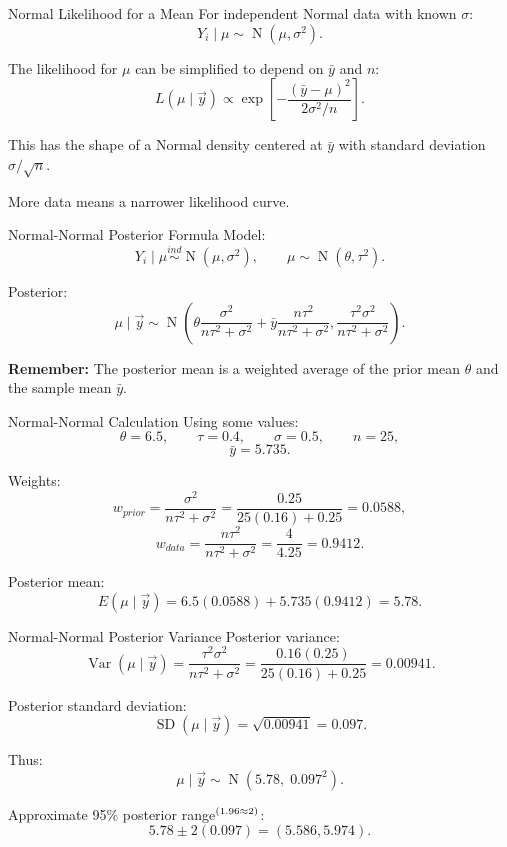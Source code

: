 \documentclass[aspectratio=43,11pt]{beamer}
\newcommand{\Normal}{\operatorname{N}}
\begin{document}
\begin{frame}{Normal Likelihood for a Mean}
For independent Normal data with known $\sigma$:
\[
  Y_i\mid\mu\sim\Normal(\mu,\sigma^2).
\]

The likelihood for $\mu$ can be simplified to depend on $\bar y$ and $n$:
\[
  L(\mu\mid\vec y)
  \propto
  \exp\left[-\frac{(\bar y-\mu)^2}{2\sigma^2/n}\right].
\]

\medskip
This has the shape of a Normal density centered at $\bar y$ with standard deviation $\sigma/\sqrt n$.

\medskip
More data means a narrower likelihood curve.
\end{frame}

\begin{frame}{Normal-Normal Posterior Formula}
Model:
\[
  Y_i\mid\mu\stackrel{ind}{\sim}\Normal(\mu,
  \sigma^2),
  \qquad
  \mu\sim\Normal(\theta,\tau^2).
\]

Posterior:
\[
  \mu\mid\vec y\sim\Normal\left(
  \theta\frac{\sigma^2}{n\tau^2+\sigma^2}
  +\bar y\frac{n\tau^2}{n\tau^2+\sigma^2},
  \frac{\tau^2\sigma^2}{n\tau^2+\sigma^2}
  \right).
\]

\medskip
\textbf{Remember:} The posterior mean is a weighted average of the prior mean $\theta$ and the sample mean $\bar y$.
\end{frame}

\begin{frame}{Normal-Normal Calculation}
Using some values:
\[
  \theta=6.5,\qquad \tau=0.4,\qquad \sigma=0.5,\qquad n=25,
\]
\[
  \bar y=5.735.
\]

Weights:
\[
  w_{prior}=\frac{\sigma^2}{n\tau^2+\sigma^2}
  =\frac{0.25}{25(0.16)+0.25}=0.0588,
\]
\[
  w_{data}=\frac{n\tau^2}{n\tau^2+\sigma^2}
  =\frac{4}{4.25}=0.9412.
\]

Posterior mean:
\[
  E(\mu\mid\vec y)=6.5(0.0588)+5.735(0.9412)=5.78.
\]
\end{frame}

\begin{frame}{Normal-Normal Posterior Variance}
Posterior variance:
\[
  \operatorname{Var}(\mu\mid\vec y)
  =\frac{\tau^2\sigma^2}{n\tau^2+\sigma^2}
  =\frac{0.16(0.25)}{25(0.16)+0.25}
  =0.00941.
\]

Posterior standard deviation:
\[
  \operatorname{SD}(\mu\mid\vec y)=\sqrt{0.00941}=0.097.
\]

Thus:
\[
  \boxed{\mu\mid\vec y\sim\Normal(5.78,\;0.097^2)}.
\]

Approximate 95\% posterior range$^{\tiny(1.96 \approx 2)}$:
\[
  5.78\pm 2(0.097)=(5.586,5.974).
\]
\end{frame}
\end{document}
